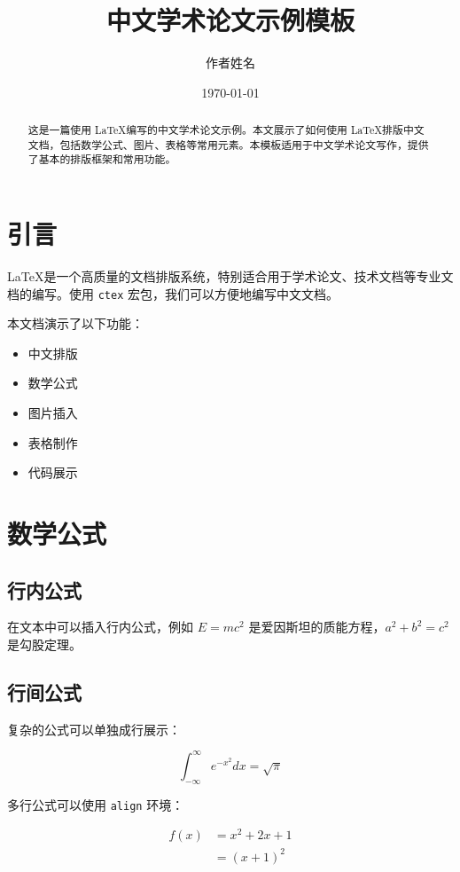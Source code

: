 \documentclass[12pt,a4paper]{article}
\title{\textbf{中文学术论文示例模板}}
\author{作者姓名}
\date{\today}
\begin{document}
\maketitle

\begin{abstract}
这是一篇使用 \LaTeX 编写的中文学术论文示例。本文展示了如何使用 \LaTeX 排版中文文档，包括数学公式、图片、表格等常用元素。本模板适用于中文学术论文写作，提供了基本的排版框架和常用功能。
\end{abstract}

\section{引言}

\LaTeX 是一个高质量的文档排版系统，特别适合用于学术论文、技术文档等专业文档的编写。使用 \texttt{ctex} 宏包，我们可以方便地编写中文文档。

本文档演示了以下功能：
\begin{itemize}
    \item 中文排版
    \item 数学公式
    \item 图片插入
    \item 表格制作
    \item 代码展示
\end{itemize}

\section{数学公式}

\subsection{行内公式}

在文本中可以插入行内公式，例如 $E = mc^2$ 是爱因斯坦的质能方程，$a^2 + b^2 = c^2$ 是勾股定理。

\subsection{行间公式}

复杂的公式可以单独成行展示：

\begin{equation}
    \int_{-\infty}^{\infty} e^{-x^2} dx = \sqrt{\pi}
\end{equation}

多行公式可以使用 \texttt{align} 环境：

\begin{align}
    f(x) &= x^2 + 2x + 1 \\
         &= (x + 1)^2
\end{align}
\end{document}
